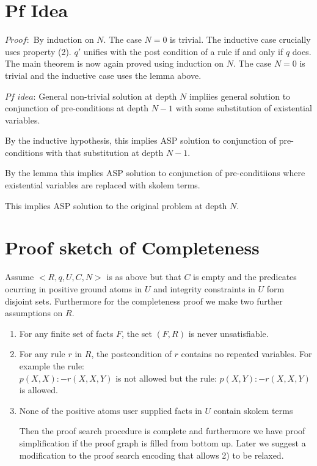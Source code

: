 \documentclass{article}
\begin{document}
\section{Pf Idea}
$Proof:$ By induction on $N$. The case $N=0$ is trivial. The inductive case crucially uses property (2). $q'$ unifies with the post condition of a rule if and only if $q$ does.
The main theorem is now again proved using induction on $N$. The case $N=0$ is trivial and the inductive case uses the lemma above.

$Pf$ $idea$: General non-trivial solution at depth $N$ impliies general solution to conjunction of pre-conditions at depth $N-1$ with some substitution of existential variables.

By the inductive hypothesis, this implies ASP solution to conjunction of pre-conditions with that substitution at depth $N-1$.

By the lemma this implies ASP solution to conjunction of pre-conditiions where existential variables are replaced with skolem terms. 

This implies ASP solution to the original problem at depth $N$.


\section{Proof sketch of Completeness}

Assume $<R,q,U,C,N>$ is as above but that $C$ is empty and the predicates ocurring in positive ground atoms in $U$ and integrity constraints in $U$ form disjoint sets. Furthermore for the completeness proof we make two further assumptions on $R$.

\begin{enumerate}
\item For any finite set of facts $F$, the set $(F,R)$ is never unsatisfiable.

\item For any rule $r$ in $R$, the postcondition of $r$ contains no repeated variables. For example the rule:\\
$p(X,X):-r(X,X,Y)$ is not allowed but the rule: $p(X,Y):-r(X,X,Y)$ is allowed.

\item None of the positive atoms user supplied facts in $U$ contain skolem terms

Then the proof search procedure is complete and furthermore we have proof simplification if the proof graph is filled from bottom up. Later we suggest a modification to the proof search encoding that allows 2) to be relaxed.
\end{enumerate}
\end{document}
